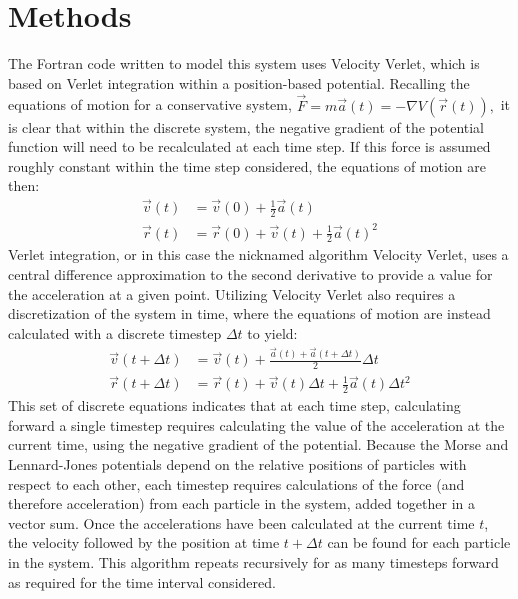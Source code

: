 \documentclass[12pt]{article}
\begin{document}
\section*{Methods}
The Fortran code written to model this system uses Velocity Verlet, which is based on Verlet integration within a position-based potential.  Recalling the equations of motion for a conservative system,  $\vec{F} = m\vec{a}(t) = -\nabla V(\vec{r}(t)),$ it is clear that within the discrete system, the negative gradient of the potential function will need to be recalculated at each time step.  If this force is assumed roughly constant within the time step considered, the equations of motion are then:
\begin{align}
\vec{v}(t) &= \vec{v}(0) + \frac{1}{2}\vec{a}(t) \\
\vec{r}(t) &= \vec{r}(0) + \vec{v}(t) + \frac{1}{2}\vec{a}(t)^2 
\end{align}
Verlet integration, or in this case the nicknamed algorithm Velocity Verlet, uses a central difference approximation to the second derivative to provide a value for the acceleration at a given point.  Utilizing Velocity Verlet also requires a discretization of the system in time, where the equations of motion are instead calculated with a discrete timestep $\Delta t$ to yield:
\begin{align}
\vec{v}(t+\Delta t) &= \vec{v}(t) + \frac{\vec{a}(t) + \vec{a}(t+\Delta t)}{2}\Delta t \\
\vec{r}(t+\Delta t) &= \vec{r}(t) + \vec{v}(t)\Delta t + \frac{1}{2}\vec{a}(t)\Delta t^2
\end{align}
This set of discrete equations indicates that at each time step, calculating forward a single timestep requires calculating the value of the acceleration at the current time, using the negative gradient of the potential.  Because the Morse and Lennard-Jones potentials depend on the relative positions of particles with respect to each other, each timestep requires calculations of the force (and therefore acceleration) from each particle in the system, added together in a vector sum.  Once the accelerations have been calculated at the current time $t$, the velocity followed by the position at time $t + \Delta t$ can be found for each particle in the system.  This algorithm repeats recursively for as many timesteps forward as required for the time interval considered.
\end{document}
